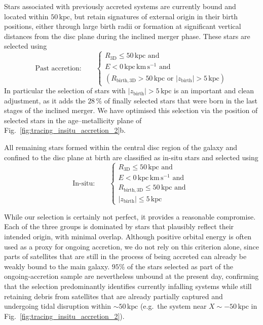 \documentclass[fleqn,usenatbib]{mnras}
\newcommand{\changed}[1]{{{#1}}}
\begin{document}
\changed{Stars associated with previously accreted systems are currently bound and located within $50\,\mathrm{kpc}$, but retain signatures of external origin in their birth positions, either through large birth radii or formation at significant vertical distances from the disc plane during the inclined merger phase. These stars are selected using}
\begin{equation} \label{eq:selection_past_accretion}
    \text{Past accretion:} \qquad \begin{cases}
    R_{\mathrm{3D}} \leq 50\,\mathrm{kpc} \text{ and }\\
    E < 0\,\mathrm{kpc\,km\,s^{-1}} \text{ and } \\
    ( R_{\mathrm{birth}, \mathrm{3D}} > 50\,\mathrm{kpc} \text{ or } |z_{\mathrm{birth}}| > 5\,\mathrm{kpc} )
    \end{cases}
\end{equation}
In particular the selection of stars with $|z_{\mathrm{birth}}| > 5\,\mathrm{kpc}$ is an important and clean adjustment, as it adds the $28\,\%$ of finally selected stars that were born in the last stages of the inclined merger. We have optimised this selection via the position of selected stars in the age–metallicity plane of Fig.~\ref{fig:tracing_insitu_accretion_2}b.

All remaining stars formed \changed{within the central disc region of the galaxy and confined to the disc plane at birth are classified as in-situ stars and selected using}
\begin{equation} \label{eq:selection_insitu}
\text{In-situ:} \qquad
\begin{cases} 
    R_{\mathrm{3D}} \leq 50\,\mathrm{kpc} \text{ and }\\
    E < 0\,\mathrm{kpc\,km\,s^{-1}} \text{ and } \\
    R_{\mathrm{birth}, \mathrm{3D}} \leq 50\,\mathrm{kpc} \text{ and }\\
    |z_{\mathrm{birth}}| \leq 5\,\mathrm{kpc}
\end{cases}
\end{equation}

While our selection is certainly not perfect, it provides a reasonable compromise. Each of the three groups is dominated by stars that plausibly reflect their intended origin, with minimal overlap. \changed{Although positive orbital energy is often used as a proxy for ongoing accretion, we do not rely on this criterion alone, since parts of satellites that are still in the process of being accreted can already be weakly bound to the main galaxy.} $95\%$ of the stars selected \changed{as part of the ongoing-accretion sample are nevertheless unbound at the present day, confirming that the selection predominantly identifies currently infalling systems while still retaining debris from satellites that are already partially captured and undergoing tidal disruption within $\sim 50\,\mathrm{kpc}$ (e.g.\ the system near $X \sim -50\,\mathrm{kpc}$ in Fig.~\ref{fig:tracing_insitu_accretion_2}).}
\end{document}
